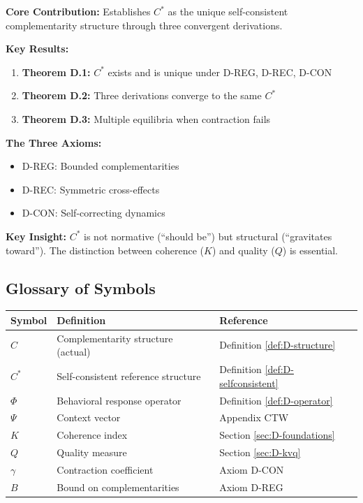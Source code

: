 \begin{tcolorbox}[colback=blue!5!white, colframe=blue!75!black,
    title=\textbf{Appendix PRF Summary: FORMAL-CSTAR}]

\textbf{Core Contribution:}
Establishes $C^*$ as the unique self-consistent complementarity structure
through three convergent derivations.

\textbf{Key Results:}
\begin{enumerate}[nosep]
    \item \textbf{Theorem D.1:} $C^*$ exists and is unique under D-REG, D-REC, D-CON
    \item \textbf{Theorem D.2:} Three derivations converge to the same $C^*$
    \item \textbf{Theorem D.3:} Multiple equilibria when contraction fails
\end{enumerate}

\textbf{The Three Axioms:}
\begin{itemize}[nosep]
    \item D-REG: Bounded complementarities
    \item D-REC: Symmetric cross-effects
    \item D-CON: Self-correcting dynamics
\end{itemize}

\textbf{Key Insight:}
$C^*$ is not normative (``should be'') but structural (``gravitates toward'').
The distinction between coherence ($K$) and quality ($Q$) is essential.

\end{tcolorbox}


\subsection{Glossary of Symbols}

\begin{center}
\renewcommand{\arraystretch}{1.3}
\begin{tabular}{@{}lll@{}}
\toprule
\textbf{Symbol} & \textbf{Definition} & \textbf{Reference} \\
\midrule
$C$ & Complementarity structure (actual) & Definition \ref{def:D-structure} \\
$C^*$ & Self-consistent reference structure & Definition \ref{def:D-selfconsistent} \\
$\Phi$ & Behavioral response operator & Definition \ref{def:D-operator} \\
$\Psi$ & Context vector & Appendix CTW \\
$K$ & Coherence index & Section \ref{sec:D-foundations} \\
$Q$ & Quality measure & Section \ref{sec:D-kvq} \\
$\gamma$ & Contraction coefficient & Axiom D-CON \\
$B$ & Bound on complementarities & Axiom D-REG \\
\bottomrule
\end{tabular}
\end{center}

